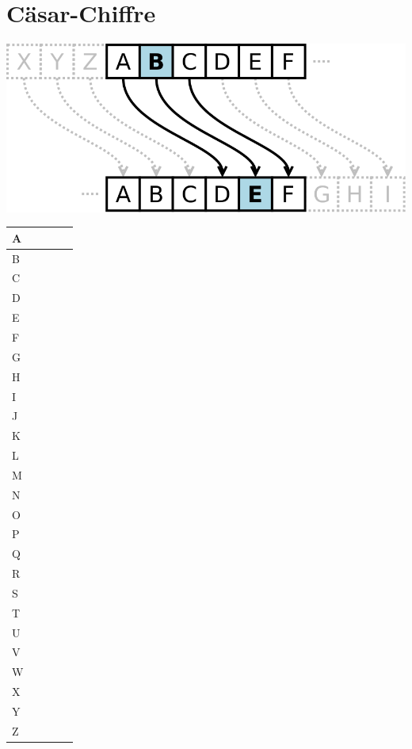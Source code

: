 \documentclass[11pt,a4paper]{article}
\begin{document}
\section{Cäsar-Chiffre}
\bigskip
\includegraphics[height=0.1\textheight]{img/caesar.png}

\begin{tabular}{|p{1cm}|p{2cm}|p{3cm}|c|c||}
\hline 
A &  \\ 
\hline 
B &  \\ 
\hline 
C &  \\ 
\hline 
D &  \\ 
\hline 
E &  \\ 
\hline 
F &  \\ 
\hline 
G &  \\ 
\hline 
H &  \\ 
\hline 
I &  \\ 
\hline 
J &  \\ 
\hline 
K &  \\ 
\hline 
L &  \\ 
\hline 
M &  \\ 
\hline 
N &  \\ 
\hline 
O &  \\ 
\hline 
P &  \\ 
\hline 
Q &  \\ 
\hline 
R &  \\ 
\hline 
S &  \\ 
\hline 
T &  \\ 
\hline 
U &  \\ 
\hline 
V &  \\ 
\hline 
W &  \\ 
\hline 
X &  \\ 
\hline 
Y &  \\ 
\hline 
Z &  \\ 
\hline 
\end{tabular} 
\end{document}
